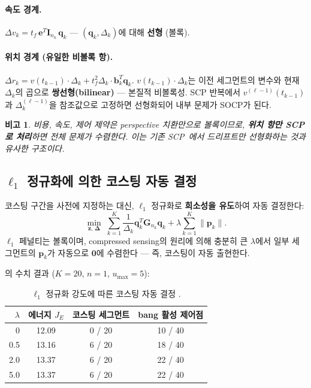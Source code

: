 \documentclass[11pt]{article}
\newtheorem{remark}{비고}
\begin{document}
\paragraph{속도 경계.}
$\Delta v_k = t_f\, \mathbf{e}^T \mathbf{I}_{n_k}\, \mathbf{q}_k$
--- $(\mathbf{q}_k, \Delta_k)$에 대해 \textbf{선형} (볼록).

\paragraph{위치 경계 (유일한 비볼록 항).}
$\Delta r_k = v(t_{k-1}) \cdot \Delta_k + t_f^2 \Delta_k \cdot \mathbf{b}_k^T \mathbf{q}_k$.
$v(t_{k-1}) \cdot \Delta_k$는 이전 세그먼트의 변수와 현재 $\Delta_k$의 곱으로
\textbf{쌍선형(bilinear)} --- 본질적 비볼록성.
SCP 반복에서 $v^{(\ell-1)}(t_{k-1})$과 $\Delta_k^{(\ell-1)}$을
참조값으로 고정하면 선형화되어 내부 문제가 SOCP가 된다.

\begin{remark}
비용, 속도, 제어 제약은 perspective 치환만으로 볼록이므로,
\textbf{위치 항만 SCP로 처리}하면 전체 문제가 수렴한다.
이는 기존 SCP~\cite{report006}에서 드리프트만 선형화하는 것과 유사한 구조이다.
\end{remark}


\subsection{$\ell_1$ 정규화에 의한 코스팅 자동 결정}
\label{sec:l1}

코스팅 구간을 사전에 지정하는 대신,
$\ell_1$ 정규화로 \textbf{희소성을 유도}하여 자동 결정한다:
\begin{equation}\label{eq:l1}
  \boxed{
  \min_{\mathbf{z},\, \boldsymbol{\Delta}} \;
  \sum_{k=1}^{K} \frac{1}{\Delta_k} \mathbf{q}_k^T \mathbf{G}_{n_k} \mathbf{q}_k
  + \lambda \sum_{k=1}^{K} \|\mathbf{p}_k\|.
  }
\end{equation}
$\ell_1$ 페널티는 볼록이며,
compressed sensing의 원리에 의해
충분히 큰 $\lambda$에서 일부 세그먼트의 $\mathbf{p}_k$가
자동으로 $\mathbf{0}$에 수렴한다 --- 즉, 코스팅이 자동 출현한다.

\cite{efc005}의 수치 결과 ($K = 20$, $n = 1$, $u_{\max} = 5$):

\begin{table}[htb]
\centering
\caption{$\ell_1$ 정규화 강도에 따른 코스팅 자동 결정 \cite{efc005}.}
\label{tab:l1}
\begin{tabular}{rccc}
\toprule
$\lambda$ & 에너지 $J_E$ & 코스팅 세그먼트 & bang 활성 제어점 \\
\midrule
0   & 12.09 & 0 / 20  & 10 / 40 \\
0.5 & 13.16 & 6 / 20  & 18 / 40 \\
2.0 & 13.37 & 6 / 20  & 22 / 40 \\
5.0 & 13.37 & 6 / 20  & 22 / 40 \\
\bottomrule
\end{tabular}
\end{table}
\end{document}
